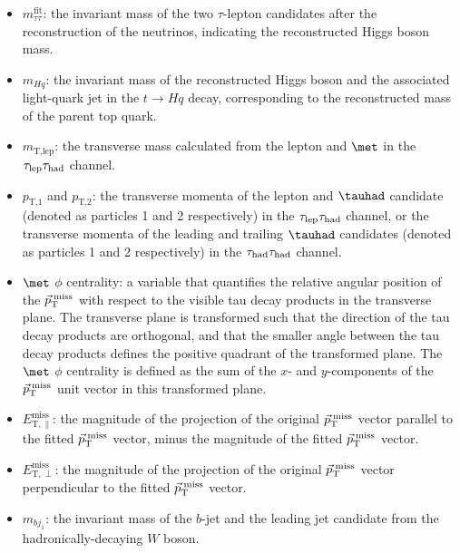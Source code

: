 \begin{itemize}
\item $m_{\tau\tau}^{\text{fit}}$: the invariant mass of the two $\tau$-lepton candidates after the reconstruction of the neutrinos, indicating the reconstructed Higgs boson mass.
\item $m_{Hq}$: the invariant mass of the reconstructed Higgs boson and the associated light-quark jet in the $t \to Hq$ decay, corresponding to the reconstructed mass of the parent top quark.
\item $m_{\text{T,lep}}$: the transverse mass calculated from the lepton and $\met$ in the $\tau_{\mathrm{lep}} \tau_{\mathrm{had}}$ channel.
\item $p_{\text{T,1}}$ and $p_{\text{T,2}}$:  the transverse momenta of the lepton and $\tauhad$ candidate (denoted as particles 1 and 2 respectively) in the $\tau_{\mathrm{lep}} \tau_{\mathrm{had}}$ channel, or the transverse momenta of the leading and trailing $\tauhad$ candidates (denoted as particles 1 and 2 respectively) in the $\tau_{\mathrm{had}} \tau_{\mathrm{had}}$ channel.
\item $\met$ $\phi$ centrality: a variable that quantifies the relative angular position of the $\vec{p}_\textrm{T}^\textrm{\;miss}$ with respect to the 
visible tau decay products in the transverse plane. The transverse plane is transformed such that the direction of the tau decay products are 
orthogonal, and that the smaller angle between the tau decay products defines the positive quadrant of the transformed plane. 
The $\met$ $\phi$ centrality is defined as the sum of the $x$- and $y$-components of the $\vec{p}_\textrm{T}^\textrm{\;miss}$ unit vector in this transformed plane.
\item $E_{\text{T},\parallel}^{\text{miss}}$: the magnitude of the projection of the original $\vec{p}_\textrm{T}^\textrm{\;miss}$ vector parallel to the fitted $\vec{p}_\textrm{T}^\textrm{\;miss}$ vector, minus 
the magnitude of the fitted $\vec{p}_\textrm{T}^\textrm{\;miss}$ vector.
\item $E_{\text{T},\perp}^{\text{miss}}$: the magnitude of the projection of the original $\vec{p}_\textrm{T}^\textrm{\;miss}$ vector perpendicular to the fitted $\vec{p}_\textrm{T}^\textrm{\;miss}$ vector.
\item $m_{b j_1}$: the invariant mass of the $b$-jet and the leading jet candidate from the hadronically-decaying $W$ boson.

\end{itemize}
